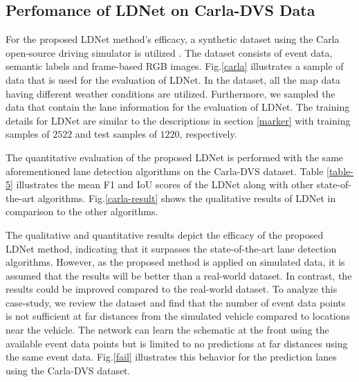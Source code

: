 \documentclass[journal]{IEEEtran}
\begin{document}
\subsection{Perfomance of LDNet on Carla-DVS Data}
For the proposed LDNet method's efficacy, a synthetic dataset using the Carla open-source driving simulator is utilized \cite{evd}. The dataset consists of event data, semantic labels and frame-based RGB images. Fig.\ref{carla} illustrates a sample of data that is used for the evaluation of LDNet. In the dataset, all the map data having different weather conditions are utilized. Furthermore, we sampled the data that contain the lane information for the evaluation of LDNet. The training details for LDNet are similar to the descriptions in section \ref{marker} with training samples of $2522$ and test samples of $1220$, respectively.
\par 
The quantitative evaluation of the proposed LDNet is performed with the same aforementioned lane detection algorithms on the Carla-DVS dataset. Table \ref{table-5} illustrates the mean F1 and IoU scores of the LDNet along with other state-of-the-art algorithms. Fig.\ref{carla-result} shows the qualitative results of LDNet in comparison to the other algorithms.
\par
The qualitative and quantitative results depict the efficacy of the proposed LDNet method, indicating that it surpasses the state-of-the-art lane detection algorithms. However, as the proposed method is applied on simulated data, it is assumed that the results will be better than a real-world dataset. In contrast, the results could be improved compared to the real-world dataset. To analyze this case-study, we review the dataset and find that the number of event data points is not sufficient at far distances from the simulated vehicle compared to locations near the vehicle. The network can learn the schematic at the front using the available event data points but is limited to no predictions at far distances using the same event data. Fig.\ref{fail} illustrates this behavior for the prediction lanes using the Carla-DVS dataset.
\end{document}
